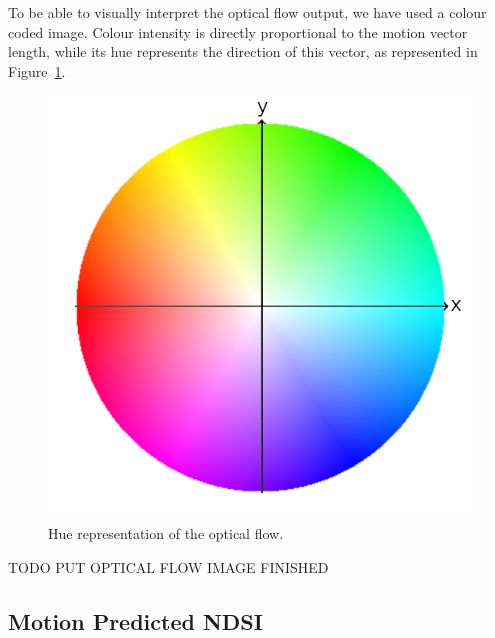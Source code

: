 \documentclass[11pt, a4paper]{report}
\begin{document}
	To be able to visually interpret the optical flow output, we have used a colour coded image. Colour intensity is directly proportional to the motion vector length, while its hue represents the direction of this vector, as represented in Figure~\ref{fig:hue_colour_wheel}.
	\begin{figure}[h!]
		\centering
		\includegraphics[scale=0.3]{../images/colorwheel.png}
		\caption{Hue representation of the optical flow.}
		\label{fig:hue_colour_wheel}
	\end{figure}
	
	TODO PUT OPTICAL FLOW IMAGE FINISHED
	

	\subsection{Motion Predicted NDSI}
	\label{seq:motion_ndsi_implementation}
	
\end{document}
